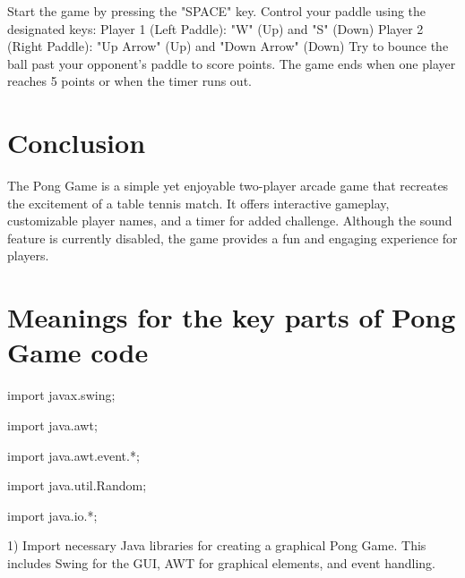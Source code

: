 \documentclass[16pt]{article}
\begin{document}
\begin{flushleft}
\Large Start the game by pressing the "SPACE" key.
\Large Control your paddle using the designated keys:
\Large Player 1 (Left Paddle): "W" (Up) and "S" (Down)
\Large Player 2 (Right Paddle): "Up Arrow" (Up) and "Down Arrow" (Down)
\Large Try to bounce the ball past your opponent's paddle to score points.
\Large The game ends when one player reaches 5 points or when the timer runs out.
\end{flushleft}

\section*{Conclusion}

\begin{flushleft}
\Large The Pong Game is a simple yet enjoyable two-player arcade game that recreates the \Large excitement of a table tennis match. It offers interactive gameplay, customizable player \Large names, and a timer for added challenge. Although the sound feature is currently \Large disabled, the game provides a fun and engaging experience for players.
\end{flushleft}

\newpage

\section*{Meanings for the key parts of Pong Game code}
\begin{flushleft}
  \large import javax.swing;
    
  \large import java.awt;
    
  \large import java.awt.event.*;
    
  \large import java.util.Random;
     
  \large import java.io.*;

  \large 1) Import necessary Java libraries for creating a graphical Pong Game. This includes Swing for the GUI, AWT for graphical elements, and event handling.
\end{flushleft}
\end{document}
